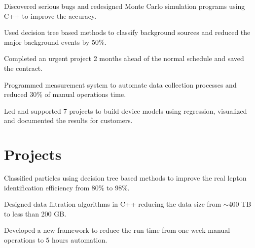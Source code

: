 \documentclass[letterpaper]{deedy-resume-openfont}
\begin{document}
\begin{tightemize}
\item Discovered serious bugs and redesigned Monte Carlo simulation programs using C++ to improve the accuracy.
\item Used decision tree based methods to classify background sources and reduced the major background events by 50\%.
\end{tightemize}
\sectionsep

\begin{tightemize}
\item Completed an urgent project 2 months ahead of the normal schedule and saved the contract.
\item Programmed measurement system to automate data collection processes and reduced 30\% of manual operations time.
\item Led and supported 7 projects to build device models using regression, visualized and documented the results for customers.
\end{tightemize}
\sectionsep


\section{Projects}


\location{}
\begin{tightemize}
\item Classified particles using decision tree based methods to improve the real lepton identification efficiency from 80\% to 98\%.
\item Designed data filtration algorithms in C++ reducing the data size from $\sim$400 TB to less than 200 GB.%
\item Developed a new framework to reduce the run time from one week manual operations to 5 hours automation.
\end{tightemize}
\sectionsep
\end{document}
